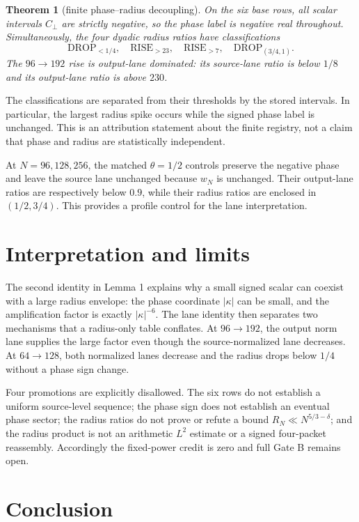 \documentclass[11pt]{article}
\newcommand{\Cp}{C_{\perp}}
\newtheorem{theorem}{Theorem}
\begin{document}
\begin{theorem}[finite phase--radius decoupling]
On the six base rows, all scalar intervals $\Cp$ are strictly negative, so the
phase label is negative real throughout.  Simultaneously, the four dyadic
radius ratios have classifications
\[
 \text{DROP}_{<1/4},\quad \text{RISE}_{>23},\quad
 \text{RISE}_{>7},\quad \text{DROP}_{(3/4,1)}.
\]
The $96\to192$ rise is output-lane dominated: its source-lane ratio is below
$1/8$ and its output-lane ratio is above $230$.
\end{theorem}

\noindent
The classifications are separated from their thresholds by the stored
intervals.  In particular, the largest radius spike occurs while the signed
phase label is unchanged.  This is an attribution statement about the finite
registry, not a claim that phase and radius are statistically independent.

At $N=96,128,256$, the matched $\theta=1/2$ controls preserve the negative
phase and leave the source lane unchanged because $w_N$ is unchanged.  Their
output-lane ratios are respectively below $0.9$, while their radius ratios
are enclosed in $(1/2,3/4)$.  This provides a profile control for the lane
interpretation.

\section{Interpretation and limits}

The second identity in Lemma 1 explains why a small signed scalar can coexist
with a large radius envelope: the phase coordinate $|\kappa|$ can be small,
and the amplification factor is exactly $|\kappa|^{-6}$.  The lane identity
then separates two mechanisms that a radius-only table conflates.  At
$96\to192$, the output norm lane supplies the large factor even though the
source-normalized lane decreases.  At $64\to128$, both normalized lanes
decrease and the radius drops below $1/4$ without a phase sign change.

Four promotions are explicitly disallowed.  The six rows do not establish a
uniform source-level sequence; the phase sign does not establish an eventual
phase sector; the radius ratios do not prove or refute a bound
$R_N\ll N^{5/3-\delta}$; and the radius product is not an arithmetic $L^2$
estimate or a signed four-packet reassembly.  Accordingly the fixed-power
credit is zero and full Gate B remains open.

\section{Conclusion}
\end{document}
